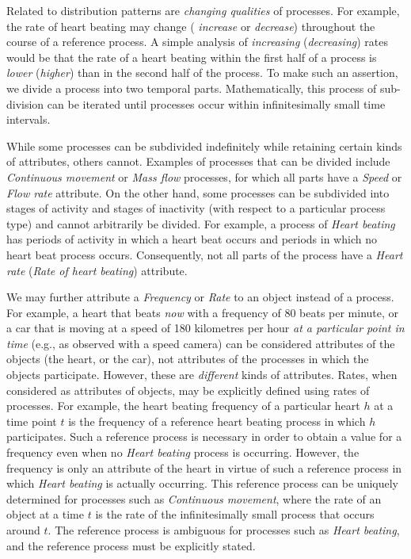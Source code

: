 \documentclass{bioinfo}
\begin{document}
Related to distribution patterns are {\em changing qualities} of
processes. For example, the rate of heart beating may change ({\em
  increase} or {\em decrease}) throughout the course of a reference
process. A simple analysis of {\em increasing} ({\em decreasing})
rates would be that the rate of a heart beating within the first half
of a process is {\em lower} ({\em higher}) than in the second half of
the process. To make such an assertion, we divide a process into two
temporal parts. Mathematically, this process of sub-division can be
iterated until processes occur within infinitesimally small time
intervals.

While some processes can be subdivided indefinitely while retaining
certain kinds of attributes, others cannot.
Examples of processes that can be divided include {\em Continuous
  movement} or {\em Mass flow} processes, for which all parts have a
{\em Speed} or {\em Flow rate} attribute. On the other hand, some
processes can be subdivided into stages of activity and stages of
inactivity (with respect to a particular process type) and cannot
arbitrarily be divided. For example, a process of {\em Heart beating}
has periods of activity in which a heart beat occurs and periods in
which no heart beat process occurs. Consequently, not all parts of the
process have a {\em Heart rate} ({\em Rate of heart beating})
attribute.

We may further attribute a {\em Frequency} or {\em Rate} to an object
instead of a process. For example, a heart that beats {\em now} with a
frequency of 80 beats per minute, or a car that is moving at a speed
of 180 kilometres per hour {\em at a particular point in time} (e.g.,
as observed with a speed camera) can be considered attributes of the
objects (the heart, or the car), not attributes of the processes in
which the objects participate. However, these are {\em different}
kinds of attributes. Rates, when considered as attributes of objects,
may be explicitly defined using rates of processes. For example, the
heart beating frequency of a particular heart $h$ at a time point $t$
is the frequency of a reference heart beating process in which $h$
participates. Such a reference process is necessary in order to obtain
a value for a frequency even when no {\em Heart beating} process is
occurring. However, the frequency is only an attribute of the heart in
virtue of such a reference process in which {\em Heart beating} is
actually occurring.  This reference process can be uniquely determined
for processes such as {\em Continuous movement}, where the rate of an
object at a time $t$ is the rate of the infinitesimally small process
that occurs around $t$. The reference process is ambiguous for
processes such as {\em Heart beating}, and the reference process must
be explicitly stated.
\end{document}
